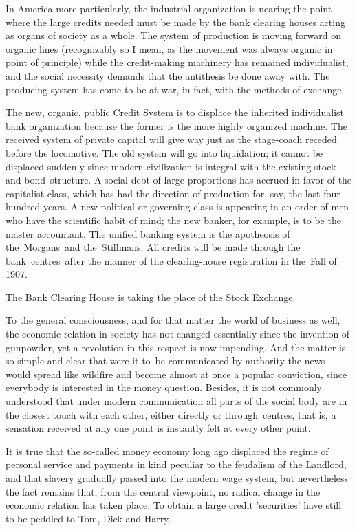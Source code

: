 \documentclass[twoside,symmetric,nobib,justified]{tufte-book}
\begin{document}
In America more particularly, the industrial organization is nearing the
point where the large credits needed must be made by the bank clearing
houses acting as organs of society as a whole. The system of production
is moving forward on organic lines (recognizably so I mean, as the
movement was always organic in point of principle) while the
credit-making machinery has remained individualist, and the social
necessity demands that the antithesis be done away with. The producing
system has come to be at war, in fact, with the methods of exchange.~

The new, organic, public Credit System is to displace the inherited
individualist bank organization because the former is the more highly
organized machine. The received system of private capital will give way
just as the stage-coach receded before the locomotive. The old system
will go into liquidation; it cannot be displaced suddenly since modern
civilization is integral with the existing stock-and-bond~structure. A
social debt of large proportions has accrued in favor of the capitalist
class, which has had the direction of production for, say, the last four
hundred years. A new political or governing class is appearing in an
order of men who have the scientific habit of mind; the new banker, for
example, is to be the master accountant. The unified banking system is
the apotheosis of the~Morgans~and the~Stillmans. All credits will be
made through the bank~centres~after the manner of the clearing-house
registration in the~Fall of 1907.~

The Bank Clearing House is taking the place of the Stock Exchange.~

To the general consciousness, and for that matter the world of business
as well, the economic relation in society has not changed essentially
since the invention of gunpowder, yet a revolution in this respect is
now impending. And the matter is so simple and clear that were it to~be
communicated by authority the news would spread like wildfire and become
almost at once a popular conviction, since everybody is interested in
the money question. Besides, it is not commonly understood that under
modern communication all parts of the social body are in the closest
touch with each other, either directly or through~centres, that is, a
sensation received at any one point is instantly felt at every other
point.~

It is true that the so-called money economy long ago displaced the
regime of personal service and payments in kind peculiar to the
feudalism of the Landlord, and that slavery gradually passed into the
modern wage system, but nevertheless the fact remains that, from the
central viewpoint, no radical change in the economic relation has taken
place. To obtain a large credit 'securities' have still to be peddled to
Tom, Dick and Harry.~
\end{document}

